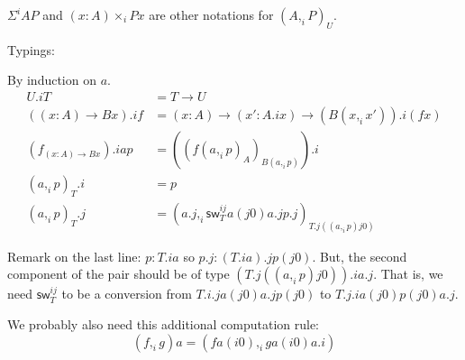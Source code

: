 \documentclass[10pt,a4paper]{article}
\newcommand\CSig[1]{\Sigma^{#1}}
\begin{document}
$\CSig i A P$ and $(x:A) ×_i P x$ are other notations for $(A ,_i P)_U$.

Typings:
\begin{mathpar}

\end{mathpar}

\newcommand\iso[3]{\mathsf{iso}(#1,#2)_{#3}}
\newcommand\sw[3]{\mathsf{sw}^{#1#2}_{#3}}

\begin{definition}[$a.i$]
By induction on $a$.
\begin{align*}
  U.i T &= T → U \\
  ((x:A) → B x).i f &= (x:A) → (x' : A.i x) → (B (x,_i x')).i (f x) \\
  (f_{(x:A) → B x}).i a p &= ((f (a,_i p)_A)_{B (a,_i p)}).i \\
  (a,_i p)_T.i  &= p \\
  (a,_i p)_T.j  &= (a.j ,_i \sw i j T a (j0) a.j p.j)_{T.j ((a ,_i p) j0)}
\end{align*}
\end{definition}


Remark on the last line: $p : T.i a$ so $p.j : (T.i a).j p(j0)$. But, the second component of the pair should be of type $(T.j ((a ,_i p) j0)).i a.j$.
That is, we need $\sw i j T$ to be a conversion from $T.i.j a(j0) a.j p(j0)$ to $T.j.i a(j0) p(j0) a.j$.

\begin{remark}
We probably also need this additional computation rule:
$$ (f ,_i g) a = (f a(i0) ,_i g a(i0) a.i) $$
\end{remark}
\end{document}

